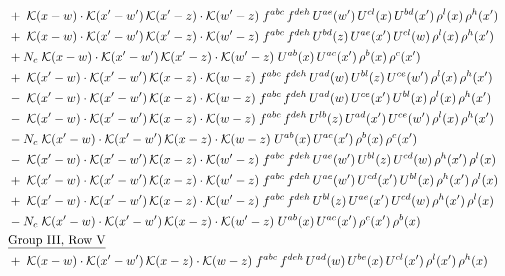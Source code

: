 \documentclass[9pt]{article}
\begin{document}
\begin{align}
&\quad +\;\mathcal{K}(x-w)\cdot\mathcal{K}(x'-w')\,\mathcal{K}(x'-z)\cdot\mathcal{K}(w'-z)\;f^{abc}\,f^{deh}\,U^{ae}(w')\,U^{cl}(x)\,U^{bd}(x')\,\rho^{l}(x)\,\rho^{h}(x')\notag\\
&\quad +\;\mathcal{K}(x-w)\cdot\mathcal{K}(x'-w')\,\mathcal{K}(x'-z)\cdot\mathcal{K}(w'-z)\;f^{abc}\,f^{deh}\,U^{bd}(z)\,U^{ae}(x')\,U^{cl}(w)\,\rho^{l}(x)\,\rho^{h}(x')\notag\\
&\quad +N_c\;\mathcal{K}(x-w)\cdot\mathcal{K}(x'-w')\,\mathcal{K}(x'-z)\cdot\mathcal{K}(w'-z)\;U^{ab}(x)\,U^{ac}(x')\,\rho^{b}(x)\,\rho^{c}(x')\notag\\
&\quad +\;\mathcal{K}(x'-w)\cdot\mathcal{K}(x'-w')\,\mathcal{K}(x-z)\cdot\mathcal{K}(w-z)\;f^{abc}\,f^{deh}\,U^{ad}(w)\,U^{bl}(z)\,U^{ce}(w')\,\rho^{l}(x)\,\rho^{h}(x')\notag\\
&\quad -\;\mathcal{K}(x'-w)\cdot\mathcal{K}(x'-w')\,\mathcal{K}(x-z)\cdot\mathcal{K}(w-z)\;f^{abc}\,f^{deh}\,U^{ad}(w)\,U^{ce}(x')\,U^{bl}(x)\,\rho^{l}(x)\,\rho^{h}(x')\notag\\
&\quad -\;\mathcal{K}(x'-w)\cdot\mathcal{K}(x'-w')\,\mathcal{K}(x-z)\cdot\mathcal{K}(w-z)\;f^{abc}\,f^{deh}\,U^{lb}(z)\,U^{ad}(x')\,U^{ce}(w')\,\rho^{l}(x)\,\rho^{h}(x')\notag\\
&\quad -N_c\;\mathcal{K}(x'-w)\cdot\mathcal{K}(x'-w')\,\mathcal{K}(x-z)\cdot\mathcal{K}(w-z)\;U^{ab}(x)\,U^{ac}(x')\,\rho^{b}(x)\,\rho^{c}(x')\notag\\
&\quad -\;\mathcal{K}(x'-w)\cdot\mathcal{K}(x'-w')\,\mathcal{K}(x-z)\cdot\mathcal{K}(w'-z)\;f^{abc}\,f^{deh}\,U^{ae}(w')\,U^{bl}(z)\,U^{cd}(w)\,\rho^{h}(x')\,\rho^{l}(x)\notag\\
&\quad +\;\mathcal{K}(x'-w)\cdot\mathcal{K}(x'-w')\,\mathcal{K}(x-z)\cdot\mathcal{K}(w'-z)\;f^{abc}\,f^{deh}\,U^{ae}(w')\,U^{cd}(x')\,U^{bl}(x)\,\rho^{h}(x')\,\rho^{l}(x)\notag\\
&\quad +\;\mathcal{K}(x'-w)\cdot\mathcal{K}(x'-w')\,\mathcal{K}(x-z)\cdot\mathcal{K}(w'-z)\;f^{abc}\,f^{deh}\,U^{bl}(z)\,U^{ae}(x')\,U^{cd}(w)\,\rho^{h}(x')\,\rho^{l}(x)\notag\\
&\quad -N_c\;\mathcal{K}(x'-w)\cdot\mathcal{K}(x'-w')\,\mathcal{K}(x-z)\cdot\mathcal{K}(w'-z)\;U^{ab}(x)\,U^{ac}(x')\,\rho^{c}(x')\,\rho^{b}(x)\notag\\
&\quad\underline{\text{Group III, Row V}}\notag\\
&\quad +\;\mathcal{K}(x-w)\cdot\mathcal{K}(x'-w')\,\mathcal{K}(x-z)\cdot\mathcal{K}(w-z)\;f^{abc}\,f^{deh}\,U^{ad}(w)\,U^{be}(x)\,U^{cl}(x')\,\rho^{l}(x')\,\rho^{h}(x)\notag\\

\end{align}
\end{document}
